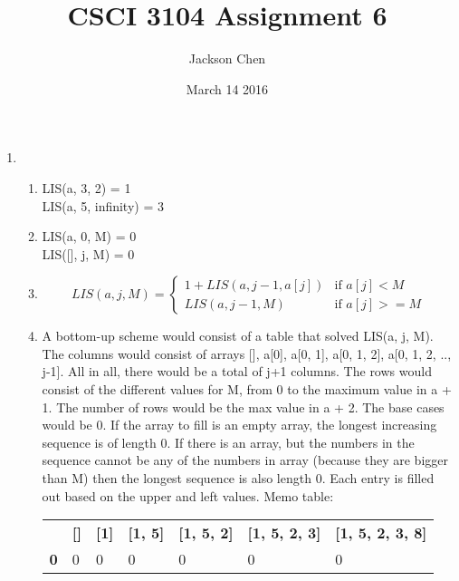 \documentclass[11pt, letterpaper]{article}
\newcommand{\subtitle}[1]{
  \posttitle{
    \par\end{center}
    \begin{center}\large#1\end{center}
    \vskip0.5em}
}
\begin{document}
  \title{CSCI 3104 Assignment 6}
    \subtitle{10:00 - 10:50 Wanshan}
    \date{March 14 2016}
    \author{Jackson Chen}
    \maketitle

  \begin{enumerate}
    \item
      \begin{enumerate}
        \item
          LIS(a, 3, 2) = 1 \\
          LIS(a, 5, infinity) = 3
        \item
          LIS(a, 0, M) = 0 \\
          LIS([], j, M) = 0
        \item
          \[ LIS(a, j, M) = \begin{cases}
                              1 + LIS(a, j-1, a[j]) & \text{if } a[j] < M \\
                              LIS(a, j-1, M) & \text{if } a[j] >= M
                            \end{cases} \]
        \item
          A bottom-up scheme would consist of a table that solved LIS(a, j, M).
          The columns would consist of arrays [], a[0], a[0, 1], a[0, 1, 2], a[0, 1, 2, .., j-1].
          All in all, there would be a total of j+1 columns. The rows would consist of the different
          values for M, from 0 to the maximum value in a + 1. The number of rows would be the max value in a + 2.
          The base cases would be 0. If the array to fill is an empty array, the longest increasing sequence
          is of length 0. If there is an array, but the numbers in the sequence cannot be any of the numbers in
          array (because they are bigger than M) then the longest sequence is also length 0. Each entry is filled out
          based on the upper and left values.
          Memo table:
          \begin{table}[h]
          \centering
          \begin{tabular}{lllllll}
                     & \textbf{{[}{]}} & \textbf{{[}1{]}} & \textbf{{[}1, 5{]}} & \textbf{{[}1, 5, 2{]}} & \textbf{{[}1, 5, 2, 3{]}} & \textbf{{[}1, 5, 2, 3, 8{]}} \\
          \textbf{0} & 0               & 0                & 0                   & 0                      & 0                         & 0                            \\

\end{tabular}
\end{table}
\end{enumerate}
\end{enumerate}
\end{document}

